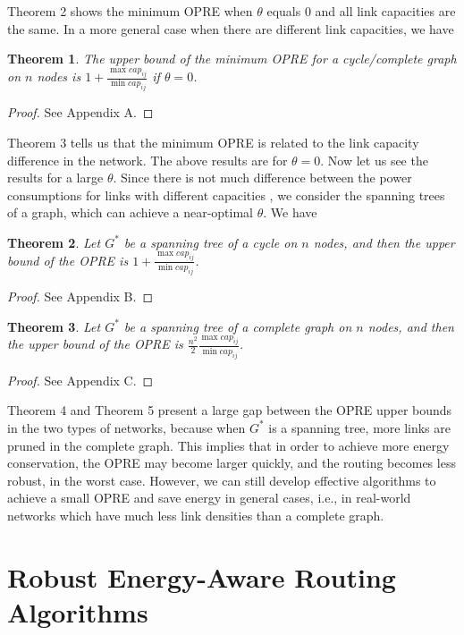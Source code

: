 \documentclass[conference]{IEEEtran}
\newtheorem{theorem}{Theorem}
\begin{document}
Theorem 2 shows the minimum OPRE when $\theta$ equals 0 and all link capacities are the same. In a more general case when there are different link capacities, we have

\begin{theorem}
The upper bound of the minimum OPRE for a cycle/complete graph on $n$ nodes is $1 + \frac{\max cap_{ij}}{\min cap_{ij}}$ if $\theta = 0$.
\end{theorem}
\begin{proof}
See Appendix A.
\end{proof}

Theorem 3 tells us that the minimum OPRE is related to the link capacity difference in the network. The above results are for $\theta = 0$. Now let us see the results for a large $\theta$. Since there is not much difference between the power consumptions for links with different capacities \cite{networking:hopbyhop}, we consider the spanning trees of a graph, which can achieve a near-optimal $\theta$. We have
\begin{theorem}
Let $G^*$ be a spanning tree of a cycle on $n$ nodes, and then the upper bound of the OPRE is $1 + \frac{\max cap_{ij}}{\min cap_{ij}}$.
\end{theorem}
\begin{proof}
See Appendix B.
\end{proof}
\begin{theorem}
Let $G^*$ be a spanning tree of a complete graph on $n$ nodes, and then the upper bound of the OPRE is $\frac{n^2}{2} \frac{\max cap_{ij}}{\min cap_{ij}}$.
\end{theorem}
\begin{proof}
See Appendix C.
\end{proof}

Theorem 4 and Theorem 5 present a large gap between the OPRE upper bounds in the two types of networks, because when $G^*$ is a spanning tree, more links are pruned in the complete graph. This implies that in order to achieve more energy conservation, the OPRE may become larger quickly, and the routing becomes less robust, in the worst case. However, we can still develop effective algorithms to achieve a small OPRE and save energy in general cases, i.e., in real-world networks which have much less link densities than a complete graph.


\section{Robust Energy-Aware Routing Algorithms}
\label{robust_energy_aware_routing_algorithms}
\end{document}
